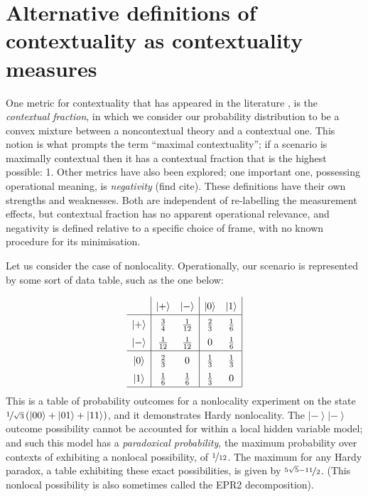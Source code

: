 \documentclass{amsart}
\theoremstyle{definition}
\newcommand{\ket}[1]{{\left\vert{#1}\right\rangle}}
\begin{document}
\section{Alternative definitions of contextuality as contextuality measures}

One metric for contextuality that has appeared in the literature \cite{Abra2011, DeSi2015}, is the \emph{contextual fraction}, in which we consider our probability distribution to be a convex mixture between a noncontextual theory and a contextual one. This notion is what prompts the term ``maximal contextuality''; if a scenario is maximally contextual then it has a contextual fraction that is the highest possible: 1. Other metrics have also been explored; one important one, possessing operational meaning, is \emph{negativity} (find cite). These definitions have their own strengths and weaknesses. Both are independent of re-labelling the measurement effects, but contextual fraction has no apparent operational relevance, and negativity is defined relative to a specific choice of frame, with no known procedure for its minimisation.

Let us consider the case of nonlocality. Operationally, our scenario is represented by some sort of data table, such as the one below:

\begin{equation}\renewcommand{\arraystretch}{1.5}
\begin{array}{c| c c | c c |} \renewcommand{\arraystretch}{1.5}
&\ket{+}&\ket{-}&\ket{0}&\ket{1}\\\hline
\ket{+}&\frac{3}{4} &\frac{1}{12}  &\frac{2}{3} & \frac{1}{6}\\
\ket{-}&\frac{1}{12} &\frac{1}{12}  &0 &\frac{1}{6}\\ \hline
\ket{0}&\frac{2}{3}&0&\frac{1}{3} &\frac{1}{3} \\
\ket{1}&\frac{1}{6}&\frac{1}{6} &\frac{1}{3} &0 \\ \hline
\end{array} \renewcommand{\arraystretch}{1}
\end{equation}
This is a table of probability outcomes for a nonlocality experiment on the state $\nicefrac{1}{\sqrt{3}}\left(\ket{00}+\ket{01}+\ket{11}\right)$, and it demonstrates Hardy nonlocality. The $\ket{-}\ket{-}$ outcome possibility cannot be accounted for within a local hidden variable model; and such this model has a \emph{paradoxical probability}, the maximum probability over contexts of exhibiting a nonlocal possibility, of $\nicefrac{1}{12}$. The maximum for any Hardy paradox, a table exhibiting these exact possibilities, is given by $\nicefrac{5\sqrt{5}-11}{2}$. (This nonlocal possibility is also sometimes called the EPR2 decomposition).
\end{document}
